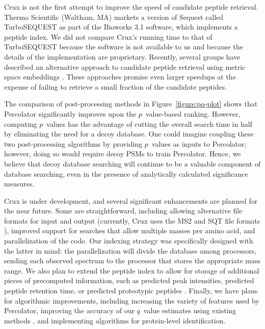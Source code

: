 \documentclass[12pt]{article}
\begin{document}
Crux is not the first attempt to improve the speed of candidate
peptide retrieval.  Thermo Scientific (Waltham, MA) markets a version
of {\sc Sequest} called TurboSEQUEST as part of the Bioworks 3.1
software, which implements a peptide index.  We did not compare Crux's
running time to that of TurboSEQUEST because the software is not
available to us and because the details of the implementation are
proprietary.  Recently, several groups have described an alternative
approach to candidate peptide retrieval using metric space embeddings
\cite{ramakrishnan:fast, dutta:speeding}.  These approaches promise
even larger speedups at the expense of failing to retrieve a small
fraction of the candidate peptides.

The comparison of post-processing methods in
Figure~\ref{figure:pq-plot} shows that Percolator significantly
improves upon the $p$~value-based ranking.  However, computing
$p$~values has the advantage of cutting the overall search time in
half by eliminating the need for a decoy database.  One could imagine
coupling these two post-processing algorithms by providing $p$~values
as inputs to Percolator; however, doing so would require decoy PSMs to
train Percolator.  Hence, we believe that decoy database searching
will continue to be a valuable component of database searching, even
in the presence of analytically calculated significance measures.

Crux is under development, and several significant enhancements are
planned for the near future.  Some are straightforward, including
allowing alternative file formats for input and output (currently,
Crux uses the MS2 and SQT file formats \cite{mcdonald:ms1}), improved
support for searches that allow multiple masses per amino acid, and
parallelization of the code. Our indexing strategy was specifically
designed with the latter in mind: the parallelization will divide the
database among processors, sending each observed spectrum to the
processor that stores the appropriate mass range.  We also plan to
extend the peptide index to allow for storage of additional pieces of
precomputed information, such as predicted peak intensities,
predicted peptide retention time, or predicted proteotypic peptides
\cite{mallick:computational}.  Finally, we have plans for algorithmic
improvements, including increasing the variety of features used by
Percolator, improving the accuracy of our $q$~value estimates using
existing methods \cite{storey:direct}, and implementing algorithms for
protein-level identification.
\end{document}
